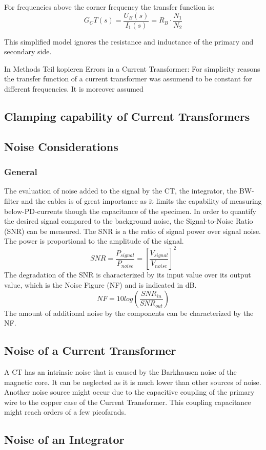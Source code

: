 For frequencies above the corner frequency the transfer function is:
\begin{equation}
G_CT(s) = \frac{U_B(s)}{I_1(s)}=R_B \cdot \frac{N_1}{N_2}
\end{equation}

This simplified model ignores the resistance and inductance of the primary and secondary side. 

In Methods Teil kopieren
Errors in a Current Transformer: 
For simplicity reasons the transfer function of a current transformer was assumend to be constant for different frequencies. It is moreover assumed  




\subsection{Clamping capability of Current Transformers }

\subsection{Noise Considerations}
\subsubsection{General}
The evaluation of noise added to the signal by the CT, the integrator, the BW-filter and the cables is of great importance as it limits the capability of measuring below-PD-currents though the capacitance of the specimen. 
In order to quantify the desired signal compared to the background noise, the Signal-to-Noise Ratio (SNR) can be measured. The SNR is a the ratio of signal power over signal noise. The power is proportional to the amplitude of the signal.
\begin{equation}
	SNR=\frac{P_{signal}}{P_{noise}} = \left[\frac{V_{signal}}{V_{noise}}\right]^2
\end{equation}
The degradation of the SNR is characterized by its input value over its output value, which is the Noise Figure (NF) and is indicated in dB.
\begin{equation}
	NF = 10log\left(\frac{SNR_{in}}{SNR_{out}}\right)
\end{equation}
The amount of additional noise by the components can be characterized by the NF. 
\subsection{Noise of a Current Transformer}
A CT has an intrinsic noise that is caused by the Barkhausen noise of the magnetic core. It can be neglected as it is much lower than other sources of noise. %
Another noise source might occur due to the capacitive coupling of the primary wire to the copper case of the Current Transformer. This coupling capacitance might reach orders of a few picofarads. %


\subsection{Noise of an Integrator}



